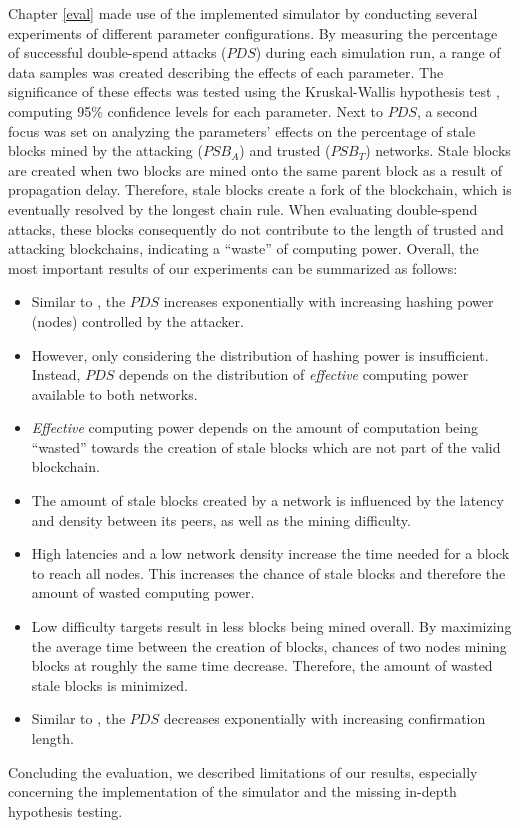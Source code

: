 \documentclass[a4paper,12pt,twoside]{report}
\begin{document}
Chapter \ref{eval} made use of the implemented simulator by conducting several experiments of different parameter configurations. By measuring the percentage of successful double-spend attacks ($PDS$) during each simulation run, a range of data samples was created describing the effects of each parameter. The significance of these effects was tested using the Kruskal-Wallis hypothesis test \cite{kruskal,r}, computing 95\% confidence levels for each parameter. Next to $PDS$, a second focus was set on analyzing the parameters' effects on the percentage of stale blocks mined by the attacking ($PSB_A$) and trusted ($PSB_T$) networks. Stale blocks are created when two blocks are mined onto the same parent block as a result of propagation delay. Therefore, stale blocks create a fork of the blockchain, which is eventually resolved by the longest chain rule. When evaluating double-spend attacks, these blocks consequently do not contribute to the length of trusted and attacking blockchains, indicating a ``waste'' of computing power. Overall, the most important results of our experiments can be summarized as follows:
\begin{itemize}
\item Similar to \cite{nakamoto2008bitcoin,HBDSA,DSAwithTime}, the $PDS$ increases exponentially with increasing hashing power (nodes) controlled by the attacker.
\item However, only considering the distribution of hashing power is insufficient. Instead, $PDS$ depends on the distribution of \textit{effective} computing power available to both networks.
\item \textit{Effective} computing power depends on the amount of computation being ``wasted'' towards the creation of stale blocks which are not part of the valid blockchain.
\item The amount of stale blocks created by a network is influenced by the latency and density between its peers, as well as the mining difficulty.
\item High latencies and a low network density increase the time needed for a block to reach all nodes. This increases the chance of stale blocks and therefore the amount of wasted computing power.
\item Low difficulty targets result in less blocks being mined overall. By maximizing the average time between the creation of blocks, chances of two nodes mining blocks at roughly the same time decrease. Therefore, the amount of wasted stale blocks is minimized.
\item Similar to \cite{HBDSA}, the $PDS$ decreases exponentially with increasing confirmation length.
\end{itemize}
Concluding the evaluation, we described limitations of our results, especially concerning the implementation of the simulator and the missing in-depth hypothesis testing. 
\end{document}
